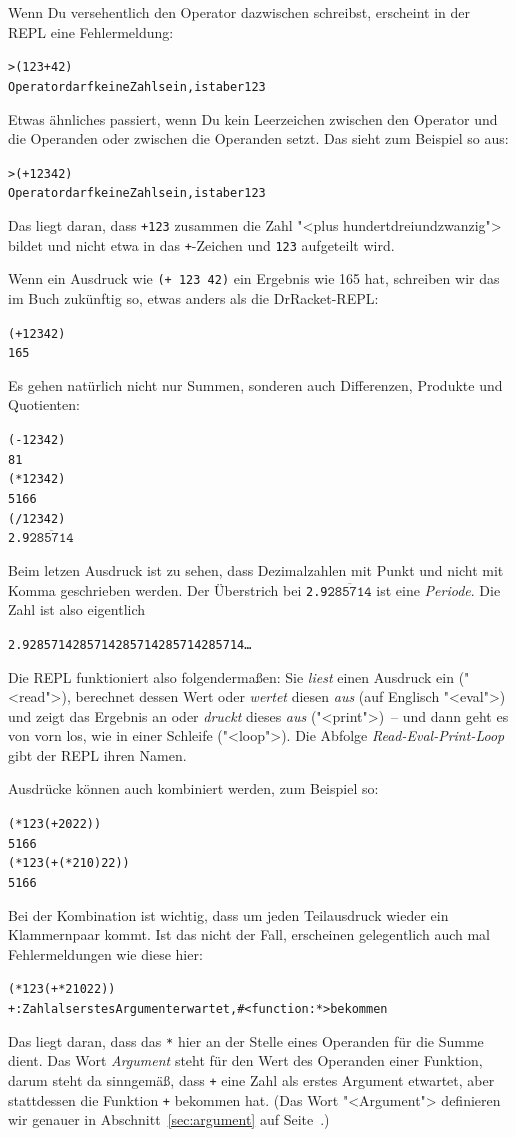 Wenn Du versehentlich den Operator dazwischen schreibst, erscheint
in der REPL eine Fehlermeldung:
%
\begin{alltt}
> ({\color{green}123} + {\color{green}42})
{\color{red}Operator darf keine Zahl sein, ist aber 123}
\end{alltt}
%
Etwas ähnliches passiert, wenn Du kein Leerzeichen zwischen den
Operator und die Operanden oder zwischen die Operanden setzt.  Das
sieht zum Beispiel so aus:
%
\begin{alltt}
> ({\color{green}+123} {\color{green}42})
{\color{red}Operator darf keine Zahl sein, ist aber 123}
\end{alltt}
%
Das liegt daran, dass \texttt{+123} zusammen die Zahl "<plus
hundertdreiundzwanzig"> bildet und nicht etwa in das \texttt{+}-Zeichen und
\texttt{123} aufgeteilt wird.

Wenn ein Ausdruck wie \texttt{(+ 123 42)} ein Ergebnis wie 165 hat,
schreiben wir das im Buch zukünftig so, etwas anders als die
DrRacket-REPL:
%
\begin{alltt}
(+ 123 42)
\evalsto{} 165
\end{alltt}
%
Es gehen natürlich nicht nur Summen, sonderen auch Differenzen,
Produkte und Quotienten:
%
\begin{alltt}
(- 123 42)
\evalsto{} 81
(* 123 42)
\evalsto{} 5166
(/ 123 42)
\evalsto{} 2.9\(\overline{\mathtt{285714}}\)
\end{alltt}
%
Beim letzen Ausdruck ist zu sehen, dass Dezimalzahlen mit Punkt und
nicht mit Komma geschrieben werden.  Der Überstrich bei
\texttt{2.9\(\overline{\mathtt{285714}}\)} ist eine
\textit{Periode}. Die Zahl ist also eigentlich
%
\begin{alltt}
2.9285714285714285714285714285714\ldots
\end{alltt}
%
Die REPL funktioniert also folgendermaßen: Sie \emph{liest} einen
Ausdruck ein ("<read">), berechnet dessen Wert oder \emph{wertet}
diesen \emph{aus} (auf Englisch "<eval">) und zeigt das Ergebnis an
oder \emph{druckt} dieses \emph{aus} ("<print">)~-- und dann geht es
von vorn los, wie in einer Schleife ("<loop">).  Die Abfolge
\emph{Read-Eval-Print-Loop} gibt der REPL ihren Namen.

Ausdrücke können auch kombiniert werden, zum Beispiel so:
%
\begin{alltt}
(* 123 (+ 20 22))
\evalsto{} 5166
(* 123 (+ (* 2 10) 22))
\evalsto{} 5166
\end{alltt}
%
Bei der Kombination ist wichtig, dass um jeden Teilausdruck wieder ein
Klammernpaar kommt.  Ist das nicht der Fall, erscheinen gelegentlich
auch mal Fehlermeldungen wie diese hier:
%
\begin{alltt}
(* 123 (+ * 2 10 22))
{\color{red}+: Zahl als erstes Argument erwartet, #<function:*> bekommen}
\end{alltt}
%
Das liegt daran, dass das \texttt{*} hier an der Stelle eines
Operanden für die Summe dient.  Das Wort \textit{Argument} steht für
den Wert des Operanden einer Funktion, darum steht da sinngemäß, dass
\texttt{+} eine Zahl als erstes Argument etwartet, aber
stattdessen die Funktion \texttt{+} bekommen hat.  (Das Wort
"<Argument"> definieren wir genauer in Abschnitt~\ref{sec:argument} auf
Seite~\pageref{sec:argument}.)

